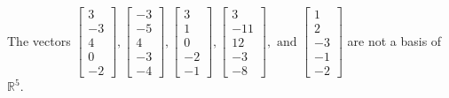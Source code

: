 \begin{exercise}
\begin{exerciseStatement}
  \end{exerciseStatement}
  \begin{exerciseAnswer}
   The vectors \(\left[\begin{array}{r}
3 \\
-3 \\
4 \\
0 \\
-2
\end{array}\right] , \left[\begin{array}{r}
-3 \\
-5 \\
4 \\
-3 \\
-4
\end{array}\right] , \left[\begin{array}{r}
3 \\
1 \\
0 \\
-2 \\
-1
\end{array}\right] , \left[\begin{array}{r}
3 \\
-11 \\
12 \\
-3 \\
-8
\end{array}\right] , \text{ and } \left[\begin{array}{r}
1 \\
2 \\
-3 \\
-1 \\
-2
\end{array}\right]\) 
  	 are not  a basis of \(\mathbb{R}^5\).
  


  \end{exerciseAnswer}
\end{exercise}
